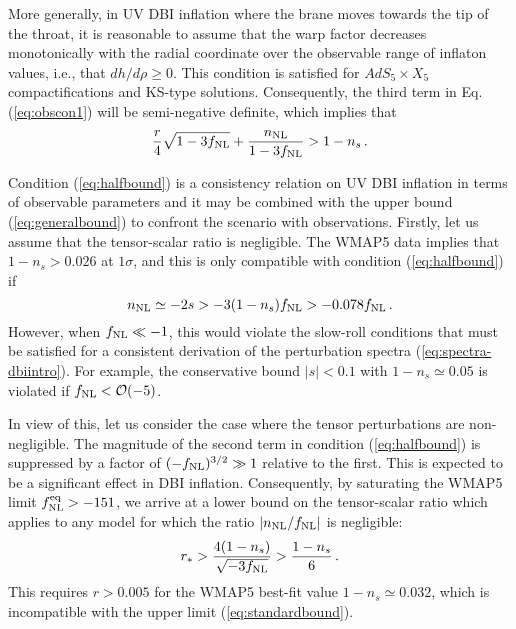 More generally, in UV DBI inflation where the brane moves towards the 
tip of the throat, it is reasonable to assume 
that the warp factor decreases monotonically 
with the radial coordinate over the observable range of inflaton values, 
i.e., that $dh/d \rho \ge 0$. This condition is satisfied for  
$AdS_5 \times X_5$ compactifications and KS-type solutions. 
Consequently, the third term in 
Eq. (\ref{eq:obscon1}) will be semi-negative definite, 
which implies that 
% 
\begin{equation}
\label{eq:halfbound}
\frac{r}{4} \sqrt{1-3f_{\mathrm{NL}}} + \frac{n_{\mathrm{NL}}}{1-3f_{\mathrm{NL}}} 
> 1-n_s \,.
\end{equation}
% 

Condition (\ref{eq:halfbound}) is a consistency relation on UV DBI 
inflation in terms of observable parameters and it 
may be combined with the upper bound 
(\ref{eq:generalbound}) to confront the scenario with observations.
Firstly, let us assume that the tensor-scalar ratio is negligible. 
The WMAP5 data implies that $1-n_s > 0.026$ at $1\sigma$, and this is only 
compatible with condition (\ref{eq:halfbound}) if 
% 
\begin{equation}
\label{eq:nnlbound}
n_{\mathrm{NL}} \simeq -2s > -3 (1-n_s ) f_{\mathrm{NL}} > -0.078 f_{\mathrm{NL}} \,.
\end{equation}
% 
However, when $f_{\mathrm{NL}} \ll -1$, this would violate the slow-roll conditions
that must be satisfied for a consistent 
derivation of the perturbation spectra 
(\ref{eq:spectra-dbiintro}). For example, the conservative 
bound $|s| < 0.1$ with $1-n_s \simeq 0.05$ is violated if  
$f_{\mathrm{NL}} < {\cal{O}} (-5)$. 

In view of this, let us consider the case where the tensor 
perturbations are non-negligible. 
The magnitude of the second term in condition (\ref{eq:halfbound}) 
is suppressed by a factor of $(-f_{\mathrm{NL}})^{3/2} \gg 1$ 
relative to the first. This is expected to 
be a significant effect in DBI inflation. 
Consequently, 
by saturating the WMAP5 limit $f_{\mathrm{NL}}^{\mathrm{eq}} > -151$, we arrive at 
a lower bound on the tensor-scalar ratio which applies   
to any model for which the ratio $|n_{\mathrm{NL}}/f_{\mathrm{NL}}|$ is 
negligible:
% 
\begin{equation}
\label{eq:lowerbound}
r_* >  \frac{4(1-n_s)}{\sqrt{-3f_{\mathrm{NL}}}} > \frac{1-n_s}{6} \,.
\end{equation}
% 
This requires $r > 0.005$ for the WMAP5 best-fit value 
$1-n_s \simeq 0.032$, which is incompatible with the upper limit 
(\ref{eq:standardbound}). 



